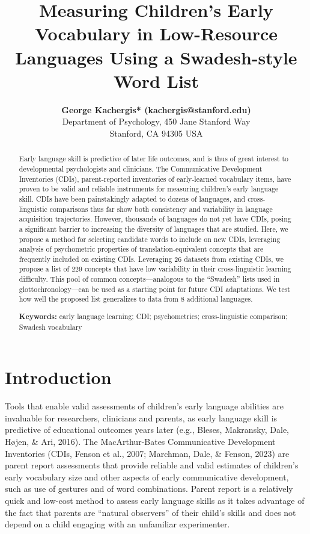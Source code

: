\documentclass[10pt, letterpaper]{article}
\title{Measuring Children's Early Vocabulary in Low-Resource Languages
Using a Swadesh-style Word List}
\author{{\large \bf George Kachergis* (kachergis@stanford.edu)}  \AND {\large \bf Alvin Wei Ming Tan* (tanawm@stanford.edu)} \AND {\large \bf Virginia A. Marchman (marchman@stanford.edu)}  \AND {\large \bf Michael C. Frank (mcfrank@stanford.edu)} \\ Department of Psychology, 450 Jane Stanford Way \\ Stanford, CA 94305 USA}
\begin{document}
\maketitle

\begin{abstract}
Early language skill is predictive of later life outcomes, and is thus
of great interest to developmental psychologists and clinicians. The
Communicative Development Inventories (CDIs), parent-reported inventories
of early-learned vocabulary items, have proven to be valid and reliable
instruments for measuring children's early language skill. CDIs have
been painstakingly adapted to dozens of languages, and cross-linguistic
comparisons thus far show both consistency and variability in language
acquisition trajectories. However, thousands of languages do not yet
have CDIs, posing a significant barrier to increasing the diversity of
languages that are studied. Here, we propose a method for selecting
candidate words to include on new CDIs, leveraging analysis of
psychometric properties of translation-equivalent concepts that are
frequently included on existing CDIs. Leveraging 26 datasets from
existing CDIs, we propose a list of 229 concepts that have low
variability in their cross-linguistic learning difficulty. This pool of
common concepts---analogous to the ``Swadesh'' lists used in
glottochronology---can be used as a starting point for future CDI
adaptations. We test how well the proposed list generalizes to data from
8 additional languages.

\textbf{Keywords:}
early language learning; CDI; psychometrics; cross-linguistic
comparison; Swadesh vocabulary
\end{abstract}

\hypertarget{introduction}{%
\section{Introduction}\label{introduction}}

Tools that enable valid assessments of children's early language
abilities are invaluable for researchers, clinicians and parents, as
early language skill is predictive of educational outcomes years later
(e.g., Bleses, Makransky, Dale, Højen, \& Ari, 2016). The
MacArthur-Bates Communicative Development Inventories (CDIs, Fenson et
al., 2007; Marchman, Dale, \& Fenson, 2023) are parent report
assessments that provide reliable and valid estimates of children's
early vocabulary size and other aspects of early communicative
development, such as use of gestures and of word combinations. Parent
report is a relatively quick and low-cost method to assess early
language skills as it takes advantage of the fact that parents are
``natural observers'' of their child's skills and does not depend on a
child engaging with an unfamiliar experimenter.
\end{document}

